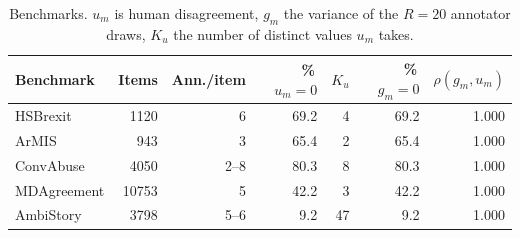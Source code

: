 \begin{table}[t]
\centering
\small
\begin{tabular}{lrrrrrr}
\hline
Benchmark & Items & Ann./item & \%\,$u_m{=}0$ & $K_u$ & \%\,$g_m{=}0$ & $\rho(g_m,u_m)$ \\
\hline
HSBrexit & 1120 & 6 & 69.2 & 4 & 69.2 & 1.000 \\
ArMIS & 943 & 3 & 65.4 & 2 & 65.4 & 1.000 \\
ConvAbuse & 4050 & 2--8 & 80.3 & 8 & 80.3 & 1.000 \\
MDAgreement & 10753 & 5 & 42.2 & 3 & 42.2 & 1.000 \\
AmbiStory & 3798 & 5--6 & 9.2 & 47 & 9.2 & 1.000 \\
\hline
\end{tabular}
\caption{Benchmarks. $u_m$ is human disagreement, $g_m$ the variance of the $R=20$ annotator draws, $K_u$ the number of distinct values $u_m$ takes.}
\label{tab:data}
\end{table}